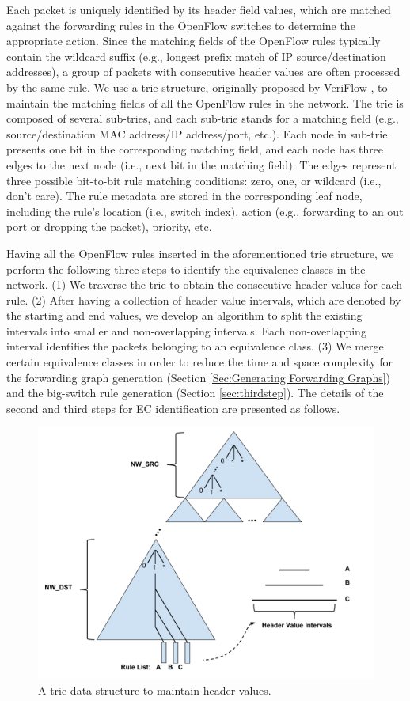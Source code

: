 Each packet is uniquely identified by its header field values, which are matched against the forwarding rules in the OpenFlow switches to determine the appropriate action. Since the matching fields of the OpenFlow rules typically contain the wildcard suffix (e.g., longest prefix match of IP source/destination addresses), a group of packets with consecutive header values are often processed by the same rule. We use a trie structure, originally proposed by VeriFlow \cite{Veriflow}, to maintain the matching fields of all the OpenFlow rules in the network. The trie is composed of several sub-tries, and each sub-trie stands for a matching field (e.g., source/destination MAC address/IP address/port, etc.). Each node in sub-trie presents one bit in the corresponding matching field, and each node has three edges to the next node (i.e., next bit in the  matching field). The edges represent three possible bit-to-bit rule matching conditions: zero, one, or wildcard (i.e., don't care). The rule metadata are stored in the corresponding leaf node, including the rule's location (i.e., switch index), action (e.g., forwarding to an out port or dropping the packet), priority, etc.

Having all the OpenFlow rules inserted in the aforementioned trie structure, we perform the following three steps to identify the equivalence classes in the network. (1) We traverse the trie to obtain the consecutive header values for each rule. (2) After having a collection of header value intervals, which are denoted by the starting and end values, we develop an algorithm to split the existing intervals into smaller and non-overlapping intervals. Each non-overlapping interval identifies the packets belonging to an equivalence class. (3) We merge certain equivalence classes in order to reduce the time and space complexity for the forwarding graph generation (Section \ref{Sec:Generating Forwarding Graphs}) and the big-switch rule generation (Section \ref{sec:thirdstep}). The details of the second and third steps for EC identification are presented as follows.

\begin{figure}[t]
\centering
\includegraphics[scale=.35]{figures/trie.pdf}
\caption{A trie data structure to maintain header values.}
\label{Fig:Trie}
\end{figure}
\fi

